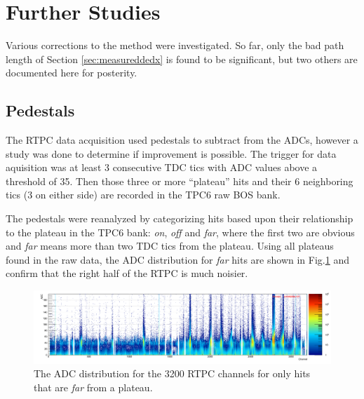 \documentclass[amsmath,amssymb,notitlepage,12pt]{revtex4-1}
\begin{document}
\clearpage
\newpage
\section{Further Studies}
Various corrections to the method were investigated.  So far, only the bad path length of Section \ref{sec:measureddedx} is found to be significant, but two others are documented here for posterity.

\subsection{Pedestals}
The RTPC data acquisition used pedestals to subtract from the ADCs, however a study was done to determine if improvement is possible.
The trigger for data aquisition was at least 3 consecutive TDC tics with ADC values above a threshold of 35.
Then those three or more ``plateau'' hits and their 6 neighboring tics (3 on either side) are recorded in the TPC6 raw BOS bank.

The pedestals were reanalyzed by categorizing hits based upon their relationship to the plateau in the TPC6 bank: {\it on}, {\it off} and {\it far}, where the first two are obvious and {\it far} means more than two TDC tics from the plateau.  Using all plateaus found in the raw data, the ADC distribution for {\it far} hits are shown in Fig.\ref{fig:far} and confirm that the right half of the RTPC is much noisier.%

\begin{figure}[htbp]\centering
    \includegraphics[width=17cm]{Rtpcadcs_far_small.png}
    \caption{The ADC distribution for the 3200 RTPC channels for only hits that are {\it far} from a plateau.\label{fig:far}}
\end{figure}
\end{document}

